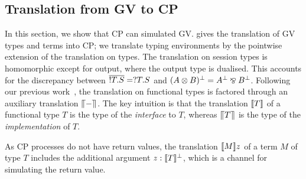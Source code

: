 \documentclass[oribibl,orivec,envcountsame]{llncs}
\begin{document}

\subsection{Translation from GV to CP}

In this section, we show that CP can simulated GV.  gives the translation of GV
types and terms into CP; we translate typing environments by the pointwise extension of the
translation on types.
%
The translation on session types is homomorphic except for output, where the output type is
dualised. This accounts for the discrepancy between $\overline{!T.S} = ?T.S$ and $(A \otimes
  B)^\perp = A^\perp \mathbin\bindnasrepma B^\perp$.
%
Following our previous work~\cite{LindleyM14}, the translation on functional types is factored through
an auxiliary translation $\llceil{-}\rrceil$. The key intuition is that the translation $\llbracket T \rrbracket$ of a
functional type $T$ is the type of the \emph{interface} to $T$, whereas $\llceil{T}\rrceil$ is the type
of the \emph{implementation} of $T$.

As CP processes do not have return values, the translation $\llbracket M \rrbracket z$ of a term $M$ of type $T$
includes the additional argument $z:\llbracket T \rrbracket^\perp$, which is a channel for simulating the return
value.

\end{document}
